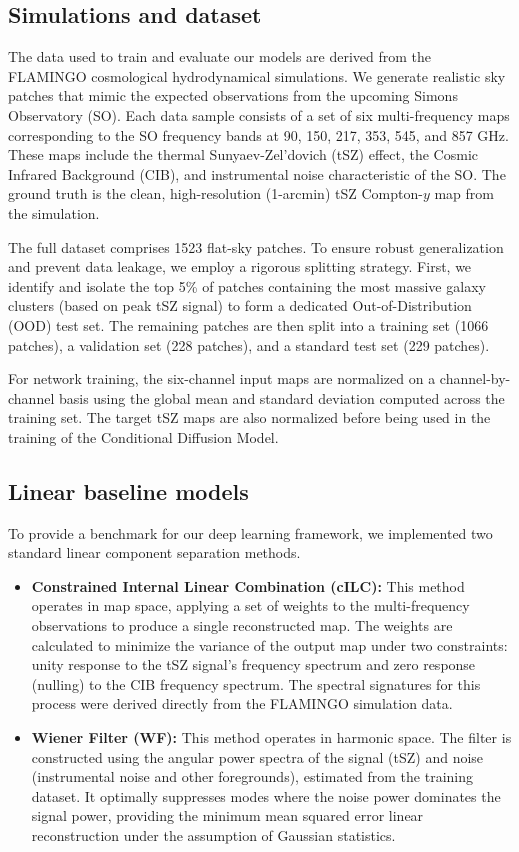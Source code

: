 \documentclass[]{article}
\begin{document}
\subsection{Simulations and dataset}
The data used to train and evaluate our models are derived from the FLAMINGO cosmological hydrodynamical simulations. We generate realistic sky patches that mimic the expected observations from the upcoming Simons Observatory (SO). Each data sample consists of a set of six multi-frequency maps corresponding to the SO frequency bands at 90, 150, 217, 353, 545, and 857 GHz. These maps include the thermal Sunyaev-Zel'dovich (tSZ) effect, the Cosmic Infrared Background (CIB), and instrumental noise characteristic of the SO. The ground truth is the clean, high-resolution (1-arcmin) tSZ Compton-$y$ map from the simulation.

The full dataset comprises 1523 flat-sky patches. To ensure robust generalization and prevent data leakage, we employ a rigorous splitting strategy. First, we identify and isolate the top 5\% of patches containing the most massive galaxy clusters (based on peak tSZ signal) to form a dedicated Out-of-Distribution (OOD) test set. The remaining patches are then split into a training set (1066 patches), a validation set (228 patches), and a standard test set (229 patches).

For network training, the six-channel input maps are normalized on a channel-by-channel basis using the global mean and standard deviation computed across the training set. The target tSZ maps are also normalized before being used in the training of the Conditional Diffusion Model.

\subsection{Linear baseline models}
To provide a benchmark for our deep learning framework, we implemented two standard linear component separation methods.
\begin{itemize}
    \item \textbf{Constrained Internal Linear Combination (cILC):} This method operates in map space, applying a set of weights to the multi-frequency observations to produce a single reconstructed map. The weights are calculated to minimize the variance of the output map under two constraints: unity response to the tSZ signal's frequency spectrum and zero response (nulling) to the CIB frequency spectrum. The spectral signatures for this process were derived directly from the FLAMINGO simulation data.
    \item \textbf{Wiener Filter (WF):} This method operates in harmonic space. The filter is constructed using the angular power spectra of the signal (tSZ) and noise (instrumental noise and other foregrounds), estimated from the training dataset. It optimally suppresses modes where the noise power dominates the signal power, providing the minimum mean squared error linear reconstruction under the assumption of Gaussian statistics.
\end{itemize}
\end{document}

